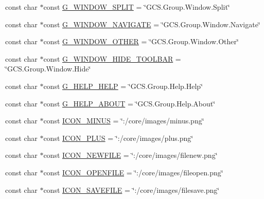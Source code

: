 \begin{DoxyCompactItemize}
\item 
const char $\ast$const \hyperlink{group___core_plugin_ga3472fada8655f283eeb17e84f03a3dfb}{G\-\_\-\-W\-I\-N\-D\-O\-W\-\_\-\-S\-P\-L\-I\-T} = \char`\"{}G\-C\-S.\-Group.\-Window.\-Split\char`\"{}
\item 
const char $\ast$const \hyperlink{group___core_plugin_ga1f2d2e1bb10010e0ffec5da4d9683007}{G\-\_\-\-W\-I\-N\-D\-O\-W\-\_\-\-N\-A\-V\-I\-G\-A\-T\-E} = \char`\"{}G\-C\-S.\-Group.\-Window.\-Navigate\char`\"{}
\item 
const char $\ast$const \hyperlink{group___core_plugin_ga17fbb7b6ee9af5abd96e1b7110343f44}{G\-\_\-\-W\-I\-N\-D\-O\-W\-\_\-\-O\-T\-H\-E\-R} = \char`\"{}G\-C\-S.\-Group.\-Window.\-Other\char`\"{}
\item 
const char $\ast$const \hyperlink{group___core_plugin_ga4190c46f07971ca1d0556fdf9c45e8b4}{G\-\_\-\-W\-I\-N\-D\-O\-W\-\_\-\-H\-I\-D\-E\-\_\-\-T\-O\-O\-L\-B\-A\-R} = \char`\"{}G\-C\-S.\-Group.\-Window.\-Hide\char`\"{}
\item 
const char $\ast$const \hyperlink{group___core_plugin_ga8e2fb85a38cf8aedef4ada147ef05f83}{G\-\_\-\-H\-E\-L\-P\-\_\-\-H\-E\-L\-P} = \char`\"{}G\-C\-S.\-Group.\-Help.\-Help\char`\"{}
\item 
const char $\ast$const \hyperlink{group___core_plugin_ga7296b3913219eb7bd0b5d11808f0dadc}{G\-\_\-\-H\-E\-L\-P\-\_\-\-A\-B\-O\-U\-T} = \char`\"{}G\-C\-S.\-Group.\-Help.\-About\char`\"{}
\item 
const char $\ast$const \hyperlink{group___core_plugin_ga730ed9f9def50bbb8a79684683085e91}{I\-C\-O\-N\-\_\-\-M\-I\-N\-U\-S} = \char`\"{}\-:/core/images/minus.\-png\char`\"{}
\item 
const char $\ast$const \hyperlink{group___core_plugin_ga1f1123aa3afe63da0ff3a3c4ad983a9b}{I\-C\-O\-N\-\_\-\-P\-L\-U\-S} = \char`\"{}\-:/core/images/plus.\-png\char`\"{}
\item 
const char $\ast$const \hyperlink{group___core_plugin_ga830208226f7ff1db69131f38a10caa1a}{I\-C\-O\-N\-\_\-\-N\-E\-W\-F\-I\-L\-E} = \char`\"{}\-:/core/images/filenew.\-png\char`\"{}
\item 
const char $\ast$const \hyperlink{group___core_plugin_gaaf4ebf7397607bf9b24a0d026240f1e9}{I\-C\-O\-N\-\_\-\-O\-P\-E\-N\-F\-I\-L\-E} = \char`\"{}\-:/core/images/fileopen.\-png\char`\"{}
\item 
const char $\ast$const \hyperlink{group___core_plugin_gadf634b2efa7db99bcc3059667b21f309}{I\-C\-O\-N\-\_\-\-S\-A\-V\-E\-F\-I\-L\-E} = \char`\"{}\-:/core/images/filesave.\-png\char`\"{}
\item 

\end{DoxyCompactItemize}
